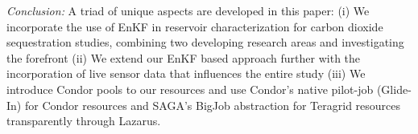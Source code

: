 \documentclass{rspublic}
\begin{document}
{\it Conclusion: } A triad of unique aspects are developed in this
paper: (i) We incorporate the use of EnKF in reservoir
characterization for carbon dioxide sequestration studies, combining
two developing research areas and investigating the forefront (ii) We
extend our EnKF based approach further with the incorporation of live
sensor data that influences the entire study (iii) We introduce Condor
pools to our resources and use Condor's native pilot-job (Glide-In)
for Condor resources and SAGA's BigJob abstraction for Teragrid
resources transparently through Lazarus. 



\end{document}
